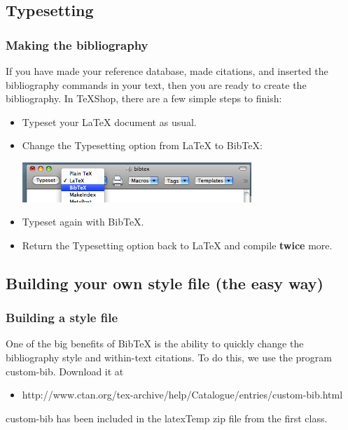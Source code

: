 \subsection{Typesetting}

\begin{frame}  \frametitle{Making the bibliography}
	If you have made your reference database, made citations, and inserted the bibliography commands in your text, then you are ready to create the bibliography. In TeXShop, there are a few simple steps to finish:
	\begin{itemize}
		\item Typeset your LaTeX document as usual.
		\item Change the Typesetting option from LaTeX to BibTeX:
		
		\vspace{1mm}
		
		\includegraphics[height=15mm]{bibtex/bibtexTypeset}\hspace{4mm}{}
		
		\item Typeset again with BibTeX.
		\item Return the Typesetting option back to LaTeX and compile \textbf{twice} more.
	\end{itemize}
\end{frame}

\subsection{Building your own style file (the easy way)}

\begin{frame}  \frametitle{Building a style file}
	One of the big benefits of BibTeX is the ability to quickly change the bibliography style and within-text citations. To do this, we use the program {\color{highlight}custom-bib}. Download it at
	\begin{itemize}\small 
		\item[] \color{highlight} http://www.ctan.org/tex-archive/help/Catalogue/entries/custom-bib.html
	\end{itemize}
	custom-bib has been included in the {\color{highlight}latexTemp} zip file from the first class.
\end{frame}

